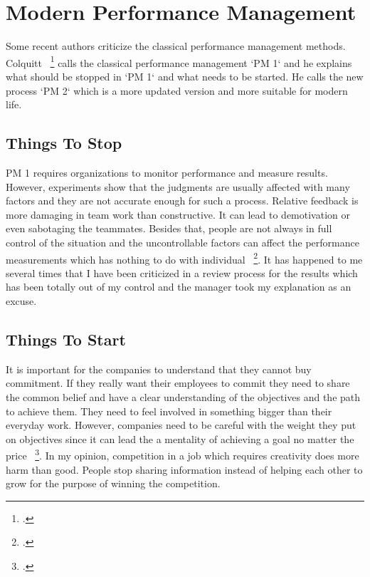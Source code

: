 \newpage
\section{Modern Performance Management} \label{PM2}

Some recent authors criticize the classical performance management methods. Colquitt ~\footcite[See. ][]{Colquitt2017} calls the classical performance management `PM 1` and he explains what should be stopped in `PM 1` and what needs to be started. He calls the new process `PM 2` which is a more updated version and more suitable for modern life.
\subsection{Things To Stop}

PM 1 requires organizations to monitor performance and measure results. However, experiments show that the judgments are usually affected with many factors and they are not accurate enough for such a process. Relative feedback is more damaging in team work than constructive. It can lead to demotivation or even sabotaging the teammates. Besides that, people are not always in full control of the situation and the uncontrollable factors can affect the performance measurements which has nothing to do with individual ~\footcite[See. ][]{Colquitt2017}. It has happened to me several times that I have been criticized in a review process for the results which has been totally out of my control and the manager took my explanation as an excuse.

\subsection{Things To Start}

It is important for the companies to understand that they cannot buy commitment. If they really want their employees to commit they need to share the common belief and have a clear understanding of the objectives and the path to achieve them. They need to feel involved in something bigger than their everyday work. However, companies need to be careful with the weight they put on objectives since it can lead the a mentality of achieving a goal no matter the price ~\footcite[See. ][]{Colquitt2017}. In my opinion, competition in a job which requires creativity does more harm than good. People stop sharing information instead of helping each other to grow for the purpose of winning the competition.





